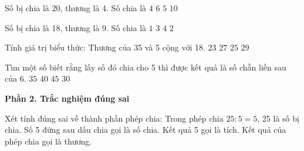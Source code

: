 \begin{ex} %
Số bị chia là 20, thương là 4. Số chia là
\choice
{$4$}
{$6$}
{\True $5$}
{$10$}
\end{ex}

\begin{ex} %
Số bị chia là 18, thương là 9. Số chia là
\choice
{$1$}
{$3$}
{$4$}
{\True $2$}
\end{ex}

\begin{ex} %
Tính giá trị biểu thức: Thương của 35 và 5 cộng với 18.
\choice
{$23$}
{$27$}
{\True $25$}
{$29$}
\end{ex}

\begin{ex} %
Tìm một số biết rằng lấy số đó chia cho 5 thì được kết quả là số chẵn liền sau của 6.
\choice
{$35$}
{\True $40$}
{$45$}
{$30$}
\end{ex}

\textbf{Phần 2. Trắc nghiệm đúng sai}

\begin{ex} %
Xét tính đúng sai về thành phần phép chia:
\choiceTF
{\True Trong phép chia $25 : 5 = 5$, 25 là số bị chia.}
{\True Số 5 đứng sau dấu chia gọi là số chia.}
{Kết quả 5 gọi là tích.}
{\True Kết quả của phép chia gọi là thương.}
\end{ex}

